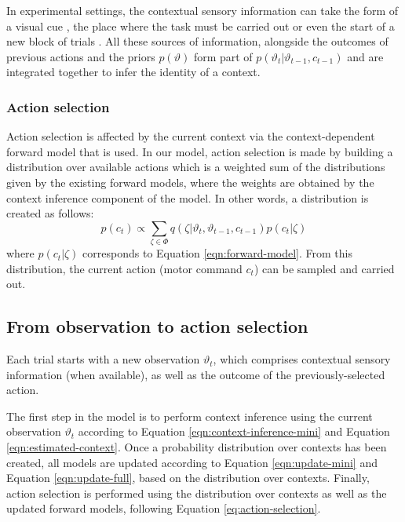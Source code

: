 \documentclass[a4paper,doc,floatsintext,natbib]{apa6}
\def \eref #1{Equation \ref{#1}}   %
\begin{document}
In experimental settings, the contextual sensory information can take the form of a visual cue \citep[e.g.][]{Lee_Dual_2009,Kim_Neural_2015}, the place where the task must be carried out \citep[e.g.][]{Forano_Timescales_2020,Shadmehr_Adaptive_1994} or even the start of a new block of trials \citep{Ethier_Spontaneous_2008}. All these sources of information, alongside the outcomes of previous actions and the priors $p(\vartheta)$ form part of $p(\vartheta_t | \vartheta_{t-1}, c_{t-1})$ and are integrated together to infer the identity of a context.


\subsubsection{Action selection}
Action selection is affected by the current context via the context-dependent forward model that is used. In our model, action selection is made by building a distribution over available actions which is a weighted sum of the distributions given by the existing forward models, where the weights are obtained by the context inference component of the model. In other words, a distribution is created as follows:
\begin{equation}
p(c_t) \propto \displaystyle\sum_{\zeta \in \Phi}q(\zeta | \vartheta_t, \vartheta_{t-1}, c_{t-1}) p(c_t | \zeta) \label{eq:action-selection}
\end{equation}
where $p(c_t | \zeta)$ corresponds to \eref{eqn:forward-model}. From this distribution, the current action (motor command $c_t$) can be sampled and carried out.


\subsection{From observation to action selection}
Each trial starts with a new observation $\vartheta_t$, which comprises contextual sensory information (when available), as well as the outcome of the previously-selected action.

The first step in the model is to perform context inference using the current observation $\vartheta_t$ according to \eref{eqn:context-inference-mini} and \eref{eqn:estimated-context}. Once a probability distribution over contexts has been created, all models are updated according to \eref{eqn:update-mini} and \eref{eqn:update-full}, based on the distribution over contexts. Finally, action selection is performed using the distribution over contexts as well as the updated forward models, following \eref{eq:action-selection}.
\end{document}
